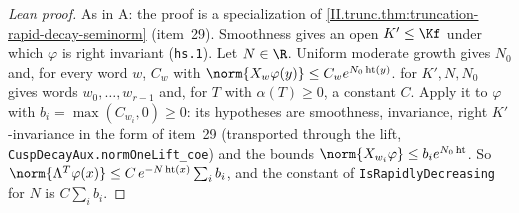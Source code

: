 \begin{proof}[Lean proof]
As in A: the proof is a specialization of \cref{II.trunc.thm:truncation-rapid-decay-seminorm} (item~29). Smoothness gives an open $K'\le\Kf$ under which $\varphi$ is right invariant (\texttt{hs.1}). Let $N\in\R$. Uniform moderate growth gives $N_0$ and, for every word $w$, $C_w$ with $\norm{X_w\varphi(y)}\le C_we^{N_0\operatorname{ht}(y)}$.  for $K',N,N_0$ gives words $w_0,\dots,w_{r-1}$ and, for $T$ with $\alpha(T)\ge0$, a constant $C$. Apply it to $\varphi$ with $b_i=\max(C_{w_i},0)\ge0$: its hypotheses are smoothness, invariance, right $K'$-invariance in the form of item~29 (transported through the lift, \texttt{CuspDecayAux.normOneLift\_coe}) and the bounds $\norm{X_{w_i}\varphi}\le b_ie^{N_0\operatorname{ht}}$. So $\norm{\Lambda^T\varphi(x)}\le C\,e^{-N\operatorname{ht}(x)}\sum_ib_i$, and the constant of \texttt{IsRapidlyDecreasing} for $N$ is $C\sum_ib_i$.
\end{proof}

